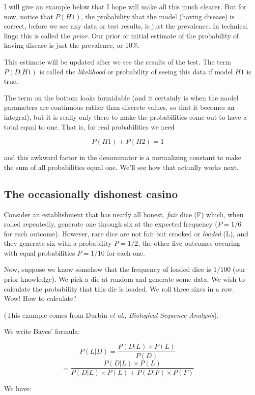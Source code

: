 \documentclass[11pt, oneside]{article}
\begin{document}
I will give an example below that I hope will make all this much clearer.  But for now, notice that $P(H1)$, the probability that the model (having disease) is correct, before we see any data or test results, is just the prevalence.  In technical lingo this is called the \emph{prior}.  Our prior or initial estimate of the probability of having disease is just the prevalence, or $10\%$.

This estimate will be updated after we see the results of the test.  The term $P(D|H1)$ is called the \emph{likelihood} or probability of seeing this data if model $H1$ is true.

The term on the bottom looks formidable (and it certainly is when the model parameters are continuous rather than discrete values, so that it becomes an integral), but it is really only there to make the probabilities come out to have a total equal to one.  That is, for real probabilities we need 

\[ P(H1) + P(H2) = 1 \]

and this awkward factor in the denominator is a normalizing constant to make the sum of all probabilities equal one.  We'll see how that actually works next.

\subsection*{The occasionally dishonest casino}

Consider an establishment that has nearly all honest, \emph{fair} dice (F) which, when rolled repeatedly, generate one through six at the expected frequency ($P = 1/6$  for each outcome).  However, rare dice are not fair but crooked or \emph{loaded} (L), and they generate six with a probability $P=1/2$, the other five outcomes occuring with equal probabilities $P=1/10$ for each one.

Now, suppose we know somehow that the frequency of loaded dice is $1/100$ (our prior knowledge).  We pick a die at random and generate some data.  We wish to calculate the probability that this die is loaded.  We roll three sixes in a row.  Wow!  How to calculate?

(This example comes from Durbin \emph{et al}., \emph{Biological Sequence Analysis}).

We write Bayes' formula:

\[ P(L|D) = \frac{P(D|L) \times P(L)}{P(D)} \]
\[ = \frac{P(D|L) \times P(L)}{P(D|L) \times P(L) + P(D|F) \times P(F)} \]

We have:
\end{document}
